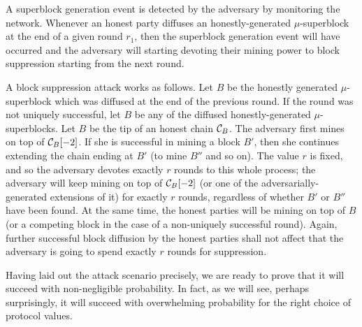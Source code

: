 A superblock generation event is detected by the adversary by monitoring the
network. Whenever an honest party diffuses an honestly-generated
$\mu$-superblock at the end of a given round $r_1$, then the superblock
generation event will have occurred and the adversary will starting devoting
their mining power to block suppression starting from the next round.

A block suppression attack works as follows. Let $B$ be the honestly generated
$\mu$-superblock which was diffused at the end of the previous round. If the
round was not uniquely successful, let $B$ be any of the diffused
honestly-generated $\mu$-superblocks. Let $B$ be the tip of an honest chain
$\mathcal{C}_B$. The adversary first mines on top of $\mathcal{C}_B[-2]$. If she is
successful in mining a block $B'$, then she continues extending the chain ending
at $B'$ (to mine $B''$ and so on). The value $r$ is fixed, and so the adversary
devotes exactly $r$ rounds to this whole process; the adversary will keep mining
on top of $\mathcal{C}_B[-2]$ (or one of the adversarially-generated extensions of
it) for exactly $r$ rounds, regardless of whether $B'$ or $B''$ have been found.
At the same time, the honest parties will be mining on top of $B$ (or a
competing block in the case of a non-uniquely successful round). Again, further
successful block diffusion by the honest parties shall not affect that the
adversary is going to spend exactly $r$ rounds for suppression.

Having laid out the attack scenario precisely, we are ready to prove that it
will succeed with non-negligible probability. In fact, as we will see, perhaps
surprisingly, it will succeed with overwhelming probability for the right choice
of protocol values.

